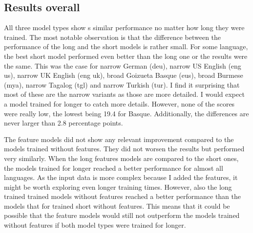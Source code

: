 \subsection{Results overall}
All three model types show s similar performance no matter how long they were trained. The most notable observation is that the difference between the performance of the long and the short models is rather small. For some language, the best short model performed even better than the long one or the results were the same. This was the case for narrow German (deu), narrow US English (eng us), narrow UK English (eng uk), broad Goizueta Basque (eus), broad Burmese (mya), narrow Tagalog (tgl) and narrow Turkish (tur). I find it surprising that most of these are the narrow variants as those are more detailed. I would expect a model trained for longer to catch more details. However, none of the scores were really low, the lowest being 19.4 for Basque. Additionally, the differences are never larger than 2.8 percentage points.

The feature models did not show any relevant improvement compared to the models trained without features. They did not worsen the results but performed very similarly. When the long features models are compared to the short ones, the models trained for longer reached a better performance for almost all languages. As the input data is more complex because I added the features, it might be worth exploring even longer training times. However, also the long trained trained models without features reached a better performance than the models that for trained short without features. This means that it could be possible that the feature models would still not outperform the models trained without features if both model types were trained for longer. 





